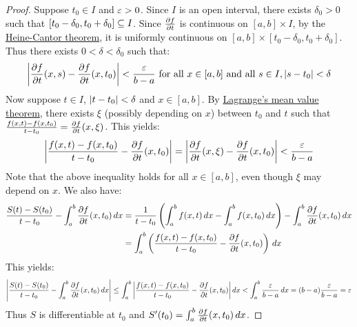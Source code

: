 \documentclass[main.tex]{subfiles}
\begin{document}
\begin{proof}
    Suppose $t_0\in I$ and $\varepsilon>0$. Since $I$ is an open interval, there exists $\delta_0>0$ such that $[t_0-\delta_0,t_0+\delta_0]\subseteq I$. Since $\pdv{f}{t}$ is continuous on $[a,b]\times I$, by the \href{https://en.wikipedia.org/wiki/Heine-Cantor_theorem}{Heine-Cantor theorem}, it is uniformly continuous on $[a,b]\times[t_0-\delta_0,t_0+\delta_0]$. Thus there exists $0<\delta<\delta_0$ such that:
    \begin{align*}
        \abs{\pdv{f}{t}\/(x,s)-\pdv{f}{t}\/(x,t_0)}<\frac{\varepsilon}{b-a} \text{ for all } x\in[a,b] \text{ and all } s\in I,\abs{s-t_0}<\delta
    \end{align*}
    Now suppose $t\in I$, $\abs{t-t_0}<\delta$ and $x\in[a,b]$. By \href{https://en.wikipedia.org/wiki/Mean_value_theorem}{Lagrange's mean value theorem}, there exists $\xi$ (possibly depending on $x$) between $t_0$ and $t$ such that $\frac{f(x,t)-f(x,t_0)}{t-t_0}=\pdv{f}{t}\/(x,\xi)$. This yields:
    \begin{equation*}
        \abs{\frac{f(x,t)-f(x,t_0)}{t-t_0}-\pdv{f}{t}\/(x,t_0)}=\abs{\pdv{f}{t}\/(x,\xi)-\pdv{f}{t}\/(x,t_0)}<\frac{\varepsilon}{b-a}
    \end{equation*}
    Note that the above inequality holds for all $x\in[a,b]$, even though $\xi$ may depend on $x$. We also have:
    \begin{align*}
        \frac{S(t)-S(t_0)}{t-t_0}-\int_a^b \pdv{f}{t}\/(x,t_0)\,dx
        &=\frac{1}{t-t_0}\left(\int_a^b f(x,t)\,dx-\int_a^b f(x,t_0)\,dx\right)-\int_a^b \pdv{f}{t}\/(x,t_0)\,dx \\
        &=\int_a^b \left(\frac{f(x,t)-f(x,t_0)}{t-t_0}-\pdv{f}{t}\/(x,t_0)\right)\,dx
    \end{align*}
    This yields:
    \begin{align*}
        \abs{\frac{S(t)-S(t_0)}{t-t_0}-\int_a^b \pdv{f}{t}\/(x,t_0)\,dx}
        \le\int_a^b \abs{\frac{f(x,t)-f(x,t_0)}{t-t_0}-\pdv{f}{t}\/(x,t_0)}\,dx
        <\int_a^b \frac{\varepsilon}{b-a}\,dx
        =(b-a)\frac{\varepsilon}{b-a}
        =\varepsilon
    \end{align*}
    Thus $S$ is differentiable at $t_0$ and $S'(t_0)=\int_a^b \pdv{f}{t}\/(x,t_0)\,dx$.
\end{proof}
\end{document}
